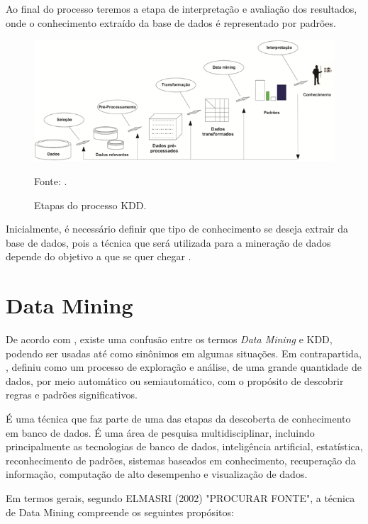 \documentclass[
	12pt,				%
	openright,			%
	oneside,	
	a4paper,				%
	english,				%
	brazil				%
]{abntex2/abntex2} %
\begin{document}
	Ao final do processo teremos a etapa de interpretação e avaliação dos resultados, onde o conhecimento extraído da base de dados é representado por padrões.
\\
		\begin{figure}[h!]
			\caption{\label{figDataMiningFayyad} Etapas do processo KDD.}
			\begin{center}
			    \includegraphics[scale=1]{img/dataMiningFayyad.png}
			\end{center}
			Fonte: \cite{fayyad:1996}.
		\end{figure}
		
		Inicialmente, é necessário definir que tipo de conhecimento se deseja extrair da base de dados, pois a técnica que será utilizada para a mineração de dados depende do objetivo a que se quer chegar \cite{damasceno:2005}.
		
	\section{Data Mining}
	
		De acordo com \cite{adriaans:1996}, existe uma confusão entre os termos \textit{Data Mining} e KDD, podendo ser usadas até como sinônimos em algumas situações. Em contrapartida, \cite{berry:1997}, definiu como um processo de exploração e análise, de uma grande quantidade  de dados, por meio automático ou semiautomático, com o propósito de descobrir regras e padrões significativos.
		
		É uma técnica que faz parte de uma das etapas da descoberta de conhecimento em banco de dados. É uma área de pesquisa multidisciplinar, incluindo principalmente as tecnologias de banco de dados, inteligência artificial, estatística, reconhecimento de padrões, sistemas baseados em conhecimento, recuperação da informação, computação de alto desempenho e visualização de dados.
		
		Em termos gerais, segundo ELMASRI (2002) "PROCURAR FONTE", a técnica de Data Mining compreende os seguintes propósitos:
		
\end{document}
